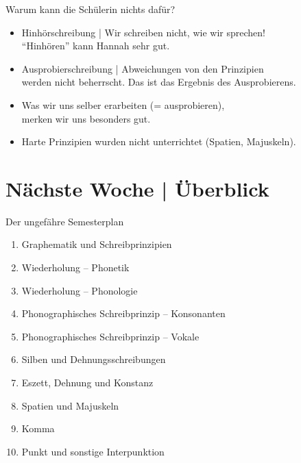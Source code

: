 \begin{frame}
  {Warum kann die Schülerin nichts dafür?}
  \begin{itemize}[<+->]
    \item \alert{Hinhörschreibung} | Wir schreiben nicht, wie wir sprechen!\\
      "`Hinhören"' kann Hannah sehr gut.
      \Zeile
    \item \alert{Ausprobierschreibung} | \alert{Abweichungen von den Prinzipien}\\
      werden nicht beherrscht. Das ist das Ergebnis des Ausprobierens.
    \item Was wir uns selber erarbeiten (= ausprobieren),\\
      merken wir uns besonders gut.
      \Zeile
    \item Harte Prinzipien wurden nicht unterrichtet (Spatien, Majuskeln).
  \end{itemize}
\end{frame}

\ifdefined\TITLE
  \section{Nächste Woche | Überblick}

  \begin{frame}
    {Der ungefähre Semesterplan}
    \begin{enumerate}[<+->]
      \item Graphematik und Schreibprinzipien
      \item \alert{Wiederholung -- Phonetik}
      \item Wiederholung -- Phonologie
      \item Phonographisches Schreibprinzip -- Konsonanten
      \item Phonographisches Schreibprinzip -- Vokale
      \item Silben und Dehnungsschreibungen
      \item Eszett, Dehnung und Konstanz
      \item Spatien und Majuskeln
      \item Komma
      \item Punkt und sonstige Interpunktion
    \end{enumerate}
  \end{frame}
\fi
